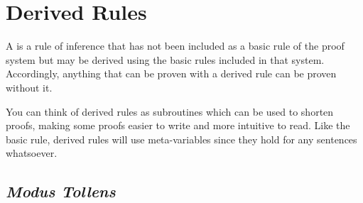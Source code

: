 
\section{Derived Rules}
\label{sec:basic}

A  is a rule of inference that has not been included as a basic rule of the proof system but may be derived using the basic rules included in that system.
Accordingly, anything that can be proven with a derived rule can be proven without it.

You can think of derived rules as subroutines which can be used to shorten proofs, making some proofs easier to write and more intuitive to read.
Like the basic rule, derived rules will use meta-variables since they hold for any sentences whatsoever.








\subsection{\textit{Modus Tollens}}

